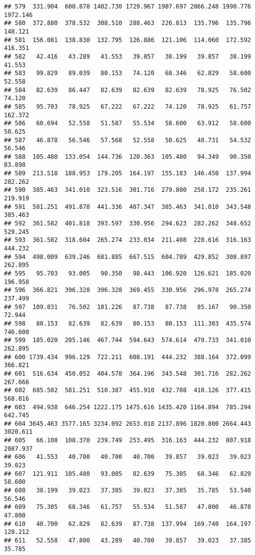 \documentclass[
]{article}
\begin{document}
\begin{verbatim}
## 579  331.904  600.878 1402.730 1729.967 1907.697 2066.248 1990.776 1972.146
## 580  372.880  378.532  308.510  288.463  226.813  135.796  135.796  148.121
## 581  156.081  138.830  132.795  126.886  121.106  114.060  172.592  416.351
## 582   42.416   43.289   41.553   39.857   38.199   39.857   38.199   41.553
## 583   99.829   89.039   80.153   74.120   68.346   62.829   58.600   52.558
## 584   82.639   86.447   82.639   82.639   82.639   78.925   76.502   74.120
## 585   95.703   78.925   67.222   67.222   74.120   78.925   61.757  162.372
## 586   60.694   52.558   51.587   55.534   58.600   63.912   58.600   50.625
## 587   46.878   56.546   57.568   52.558   50.625   48.731   54.532   56.546
## 588  105.480  133.054  144.736  120.363  105.480   94.349   90.350   83.898
## 589  213.518  188.953  179.205  164.197  155.183  146.450  137.994  282.262
## 590  385.463  341.010  323.516  301.716  279.800  258.172  235.261  219.919
## 591  581.251  491.878  441.336  407.347  385.463  341.010  343.548  385.463
## 592  361.582  401.818  393.597  330.956  294.623  282.262  348.652  529.245
## 593  361.582  318.604  265.274  233.034  211.408  228.616  316.163  444.232
## 594  498.009  639.246  681.885  667.515  604.789  429.852  308.897  262.895
## 595   95.703   93.005   90.350   98.443  106.920  126.621  185.020  196.958
## 596  366.821  396.328  396.328  369.455  330.956  296.978  265.274  237.499
## 597  109.831   76.502  101.226   87.738   87.738   85.167   90.350   72.944
## 598   80.153   82.639   82.639   80.153   80.153  111.303  435.574  746.600
## 599  185.020  205.146  467.744  594.643  574.614  479.733  341.010  262.895
## 600 1739.434  996.129  722.211  608.191  444.232  388.164  372.099  366.821
## 601  516.634  450.052  404.578  364.196  343.548  301.716  282.262  267.666
## 602  685.502  581.251  510.387  455.910  432.708  410.126  377.415  568.016
## 603  494.938  646.254 1222.175 1475.616 1435.420 1164.894  785.294  642.745
## 604 3645.463 3577.165 3234.092 2653.018 2137.896 1820.800 2664.443 3020.611
## 605   66.108  108.370  239.749  253.495  316.163  444.232  807.918 2087.937
## 606   41.553   40.700   40.700   40.700   39.857   39.023   39.023   39.023
## 607  121.911  105.480   93.005   82.639   75.305   68.346   62.829   58.600
## 608   38.199   39.023   37.385   39.023   37.385   35.785   53.540   56.546
## 609   75.305   68.346   61.757   55.534   51.587   47.800   46.878   47.800
## 610   40.700   62.829   82.639   87.738  137.994  169.740  164.197  128.212
## 611   52.558   47.800   43.289   40.700   39.857   39.023   37.385   35.785

\end{verbatim}
\end{document}
